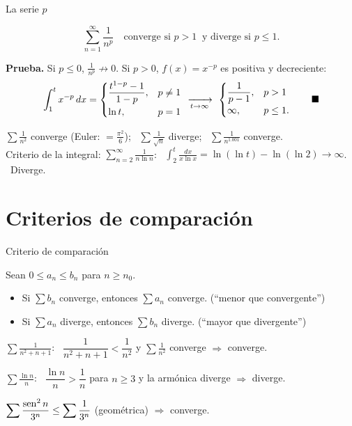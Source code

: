 \documentclass[10pt,aspectratio=169]{beamer}
\begin{document}
\begin{frame}{La serie $p$}
  \begin{teorema}[serie $p$]
    \[ \sum_{n=1}^\infty\frac1{n^p}\quad\text{converge si } p>1\ \text{ y diverge si } p\le1. \]
  \end{teorema}
  \textbf{Prueba.} Si $p\le0$, $\frac1{n^p}\not\to0$. Si $p>0$, $f(x)=x^{-p}$ es positiva y decreciente:
  \[ \int_1^tx^{-p}\,dx=\begin{cases}\dfrac{t^{1-p}-1}{1-p},&p\ne1\\[2mm] \ln t,&p=1\end{cases}\ \xrightarrow[t\to\infty]{}\
     \begin{cases}\dfrac1{p-1},&p>1\\ \infty,&p\le1.\end{cases}\qquad\blacksquare \]
  \begin{ejemplo}
    $\sum\frac1{n^2}$ converge (Euler: $=\frac{\pi^2}{6}$); \ $\sum\frac1{\sqrt n}$ diverge; \ $\sum\frac{1}{n^{1.001}}$ converge.\\
    Criterio de la integral:
    $\displaystyle\sum_{n=2}^\infty\frac{1}{n\ln n}$: \ $\displaystyle\int_2^t\frac{dx}{x\ln x}=\ln(\ln t)-\ln(\ln2)\to\infty$. \ Diverge.
  \end{ejemplo}
\end{frame}

\section{Criterios de comparación}

\begin{frame}{Criterio de comparación}
  \begin{teorema}
    Sean $0\le a_n\le b_n$ para $n\ge n_0$.
    \begin{itemize}
      \item Si $\sum b_n$ converge, entonces $\sum a_n$ converge. \quad (``menor que convergente'')
      \item Si $\sum a_n$ diverge, entonces $\sum b_n$ diverge. \quad (``mayor que divergente'')
    \end{itemize}
  \end{teorema}
  \begin{ejemplo}[1]
    $\displaystyle\sum\frac{1}{n^2+n+1}$: \ $\dfrac1{n^2+n+1}<\dfrac1{n^2}$ y $\sum\frac1{n^2}$ converge $\Rightarrow$ converge.
  \end{ejemplo}
  \begin{ejemplo}[2]
    $\displaystyle\sum\frac{\ln n}{n}$: \ $\dfrac{\ln n}{n}>\dfrac1n$ para $n\ge3$ y la armónica diverge $\Rightarrow$ diverge.
  \end{ejemplo}
  \begin{ejemplo}[3]
    $\displaystyle\sum\frac{\operatorname{sen}^2n}{3^n}\le\sum\frac1{3^n}$ (geométrica) $\Rightarrow$ converge.
  \end{ejemplo}
\end{frame}
\end{document}
